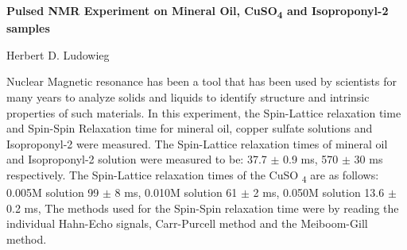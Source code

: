 \documentclass{article}
\begin{document}
\Centering
\textbf{Pulsed NMR Experiment on Mineral Oil, CuSO\textsubscript{4} and 
Isoproponyl-2 samples} \\
\small{Herbert D. Ludowieg \\
\begin{adjustwidth}{0.5in}{0.5in}
\justify
Nuclear Magnetic resonance has been a tool that has been used by scientists for
many years to analyze solids and liquids to identify structure and intrinsic 
properties of such materials. In this experiment, the Spin-Lattice relaxation 
time and Spin-Spin Relaxation time for mineral oil, copper sulfate solutions 
and Isoproponyl-2 were measured. The Spin-Lattice relaxation times of mineral 
oil and Isoproponyl-2 solution were measured to be: 37.7 $\pm$ 0.9 ms, 570 
$\pm$ 30 ms respectively. The Spin-Lattice relaxation times of the CuSO
\textsubscript{4} are as follows: 0.005M solution 99 $\pm$ 8 ms, 0.010M 
solution 61 $\pm$ 2 ms, 0.050M solution 13.6 $\pm$ 0.2 ms, The methods used for the Spin-Spin relaxation 
time were by reading the individual Hahn-Echo signals, Carr-Purcell method and 
the Meiboom-Gill method. 
\end{adjustwidth}%
\begin{multicols}{2}
\end{multicols}
}
\end{document}
